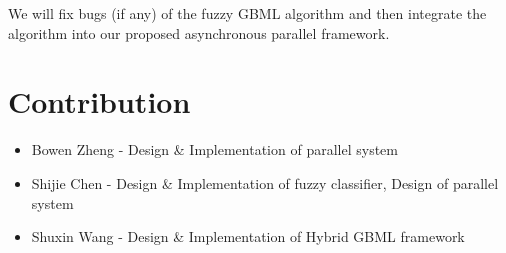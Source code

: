 \documentclass[conference]{IEEEtran}
\begin{document}
 We will fix bugs (if any) of the fuzzy GBML algorithm and then integrate the algorithm into our proposed asynchronous parallel framework. 

  \section{Contribution}
  
    \begin{itemize}
    \item Bowen Zheng - Design \& Implementation of parallel system
    \item Shijie Chen - Design \& Implementation of fuzzy classifier, Design of parallel system
    \item Shuxin Wang - Design \& Implementation of Hybrid GBML framework
    \end{itemize}



\end{document}
